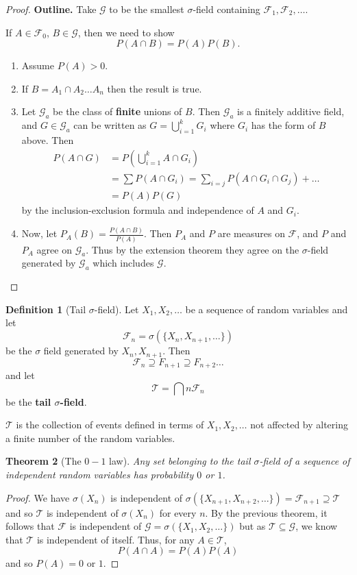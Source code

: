 \documentclass[10pt, oneside, reqno]{amsart}
\theoremstyle{plain}%
\newtheorem{thm}{Theorem}[section]
\theoremstyle{definition}
\newtheorem{defn}[thm]{Definition}
\theoremstyle{remark}
\newcommand{\sigf}{\mathcal{F}}
\begin{document}
\begin{proof}
	\textbf{Outline.} Take $\mathcal{G}$ to be the smallest $\sigma$-field containing $\sigf_1, \sigf_2, \dots$.  
	
	If $A \in \sigf_0$, $B \in \mathcal{G}$, then we need to show \[
		P(A \cap B) = P(A) P(B).
	\]
	\begin{enumerate}[(1)]
		\item Assume $P(A) > 0$. 
		\item If $B = A_1 \cap A_2 \dots A_n$ then the result is true.
		\item Let $\mathcal{G}_a$ be the class of \textbf{finite} unions of $B$.  Then $\mathcal{G}_a$ is a finitely additive field, and $G \in \mathcal{G}_a$ can be written as $G = \bigcup_{i=1}^k G_i$ where $G_i$ has the form of $B$ above.  Then 
		\begin{align*}
			P(A \cap G) &= P( \bigcup_{i=1}^k A \cap G_i) \\
						&= \sum P(A \cap G_i) = \sum_{i=j} P(A \cap G_i \cap G_j) + \dots \\
						&= P(A) P(G)
		\end{align*} by the inclusion-exclusion formula and independence of $A$ and $G_i$.  
		\item Now, let $P_A(B) = \frac{P(A\cap B)}{P(A)}$.  Then $P_A$ and $P$ are measures on $\sigf$, and $P$ and $P_A$ agree on $\mathcal{G}_a$.  Thus by the extension theorem they agree on the $\sigma$-field generated by $\mathcal{G}_a$ which includes $\mathcal{G}$.
	\end{enumerate}
\end{proof}

\begin{defn}[Tail $\sigma$-field]
	Let $X_1, X_2, \dots$ be a sequence of random variables and let \[
		\sigf_n = \sigma(\{ X_n , X_{n+1}, \dots \})
	\] be the $\sigma$ field generated by $X_n, X_{n+1}$.  Then \[
		\sigf_n \supseteq F_{n+1} \supseteq F_{n+2} \dots
	\] and let \[
		\mathcal{T} = \bigcap{n} \sigf_n
	\] be the \textbf{tail $\sigma$-field}.
	
	$\mathcal{T}$ is the collection of events defined in terms of $X_1, X_2, \dots$ not affected by altering a finite number of the random variables.  

\end{defn}

\begin{thm}[The $0-1$ law]
	Any set belonging to the tail $\sigma$-field of a sequence of independent random variables has probability $0$ or $1$.  	
\end{thm}	
\begin{proof}
	We have $\sigma(X_n)$ is independent of $\sigma( \{ X_{n+1}, X_{n+2}, \dots \}) = \sigf_{n+1} \supseteq \mathcal{T}$ and so $\mathcal{T}$ is independent of $\sigma(X_n)$ for every $n$.  By the previous theorem, it follows that $\sigf$ is independent of $\mathcal{G} = \sigma(\{ X_1, X_2, \dots \})$ but as $\mathcal{T} \subseteq \mathcal{G}$, we know that $\mathcal{T}$ is independent of itself.  Thus, for any $A \in \mathcal{T}$, \[
		P(A \cap A) = P(A) P(A)
	\] and so $P(A) = 0$ or $1$.  
\end{proof}
\end{document}
